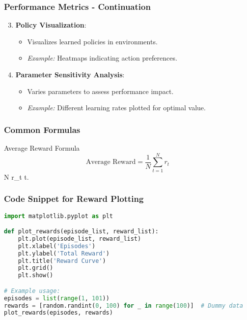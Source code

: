 \documentclass[aspectratio=169]{beamer}
\begin{document}
\begin{frame}[fragile]
    \frametitle{Performance Metrics - Continuation}
    \begin{enumerate}
        \setcounter{enumi}{2} %
        \item \textbf{Policy Visualization}:
            \begin{itemize}
                \item Visualizes learned policies in environments.
                \item \textit{Example:} Heatmaps indicating action preferences.
            \end{itemize}
        \item \textbf{Parameter Sensitivity Analysis}:
            \begin{itemize}
                \item Varies parameters to assess performance impact.
                \item \textit{Example:} Different learning rates plotted for optimal value.
            \end{itemize}
    \end{enumerate}
\end{frame}

\begin{frame}[fragile]
    \frametitle{Common Formulas}
    \begin{block}{Average Reward Formula}
        \begin{equation}
            \text{Average Reward} = \frac{1}{N} \sum_{t=1}^{N} r_t
        \end{equation}
         N  r_t  t.
    \end{block}
\end{frame}

\begin{frame}[fragile]
    \frametitle{Code Snippet for Reward Plotting}
    \begin{lstlisting}[language=Python]
import matplotlib.pyplot as plt

def plot_rewards(episode_list, reward_list):
    plt.plot(episode_list, reward_list)
    plt.xlabel('Episodes')
    plt.ylabel('Total Reward')
    plt.title('Reward Curve')
    plt.grid()
    plt.show()

# Example usage:
episodes = list(range(1, 101))
rewards = [random.randint(0, 100) for _ in range(100)]  # Dummy data
plot_rewards(episodes, rewards)
    \end{lstlisting}
\end{frame}
\end{document}
